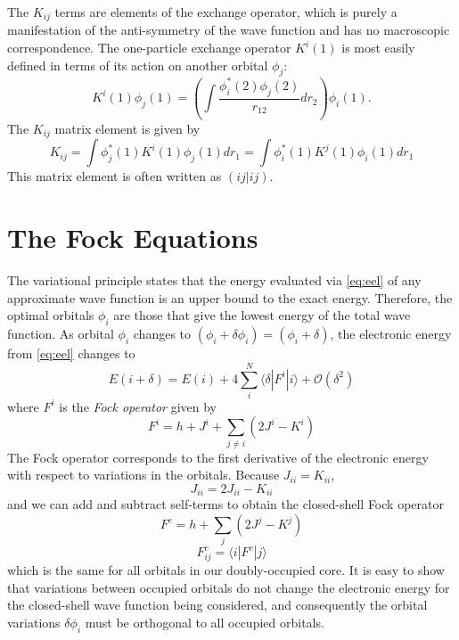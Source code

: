 The $K_{ij}$ terms are elements of the exchange operator, which is
purely a manifestation of the anti-symmetry of the wave function and
has no macroscopic correspondence. The one-particle exchange operator
$K^i(1)$ is most easily defined in terms of its action on another
orbital $\phi_j$:
\begin{equation}
  K^i(1)\phi_j(1) = \left(\int\frac{\phi_i^*(2)\phi_j(2)}
		{r_{12}}dr_2\right)\phi_i(1).
\label{eq:kone}
\end{equation}
The $K_{ij}$ matrix element is given by
\begin{equation}
  K_{ij} = \int\phi_j^*(1)K^i(1)\phi_j(1)dr_1 
	= \int\phi_i^*(1)K^j(1)\phi_i(1)dr_1 
\end{equation}
This matrix element is often written as $(ij|ij)$.

\section{The Fock Equations}
\label{sec:fock}
The variational principle states that the energy evaluated via
\ref{eq:eel} of any approximate wave function is an upper
bound to the exact energy. Therefore, the optimal
orbitals ${\phi_i}$ are those that give the lowest energy of
the total wave function. As orbital $\phi_i$ changes to $(\phi_i
+ \delta\phi_i) = (\phi_i + \delta)$, the electronic energy from
\ref{eq:eel} changes to
\begin{equation}
  E(i+\delta) = E(i) + 4\sum_i^N\langle\delta|F^i|i\rangle
	+ \mathcal{O}(\delta^2)
\end{equation}
where $F^i$ is the \emph{Fock operator} given by
\begin{equation}
  F^i = h + J^i + \sum_{j\neq i}(2J^i-K^i)
\label{eq:fock}
\end{equation}
The Fock operator corresponds to the first derivative of the
electronic energy with respect to variations in the orbitals.  Because
$J_{ii} = K_{ii}$,
\begin{equation}
  J_{ii} = 2J_{ii} - K_{ii}
\end{equation}
and we can add and subtract self-terms to obtain the
closed-shell Fock operator
\begin{equation}
  F^c = h + \sum_j (2J^j-K^j)
\end{equation} 
\begin{equation}
  F^c_{ij} = \langle i|F^c|j \rangle
\end{equation}
which is the same for all orbitals in our doubly-occupied
core. It is easy to show that variations between occupied orbitals do
not change the electronic energy for the closed-shell wave function
being considered, and consequently the orbital variations
$\delta\phi_i$ must be orthogonal to all occupied orbitals.

